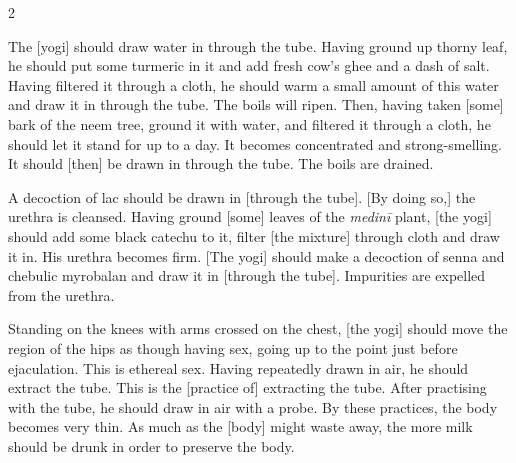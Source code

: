 \begin{nohyp}
\begin{multicols}{2}
\begin{eng}

The [yogi] should draw water in through the tube. Having ground up thorny leaf, he should put some turmeric in it and add fresh cow’s ghee and a dash of salt. Having filtered it through a cloth, he should warm a small amount of this water and draw it in through the tube. The boils will ripen. Then, having taken [some] bark of the neem tree, ground it with water, and filtered it through a cloth, he should let it stand for up to a day. It becomes concentrated and strong-smelling. It should [then] be drawn in through the tube. The boils are drained.

A decoction of lac should be drawn in [through the tube].  [By doing so,] the urethra is cleansed. Having ground [some] leaves of the \textit{medinī} plant,  [the yogi] should add some black catechu to it, filter [the mixture] through cloth and draw it in. His urethra becomes firm. [The yogi] should make a decoction of senna and chebulic myrobalan and draw it in [through the tube]. Impurities are expelled from the urethra.
\vskip 7pt


Standing on the knees with arms crossed on the chest, [the yogi] should move the region of the hips as though having sex, going up to the point just before ejaculation. This is ethereal sex. Having repeatedly drawn in air, he should extract the tube. This is the [practice of] extracting the tube. After practising with the tube, he should draw in air with a probe. By these practices, the body becomes very thin. As much as the [body] might waste away, the more milk should be drunk in order to preserve the body.
\columnbreak


\end{eng}
\end{multicols}
\end{nohyp}
